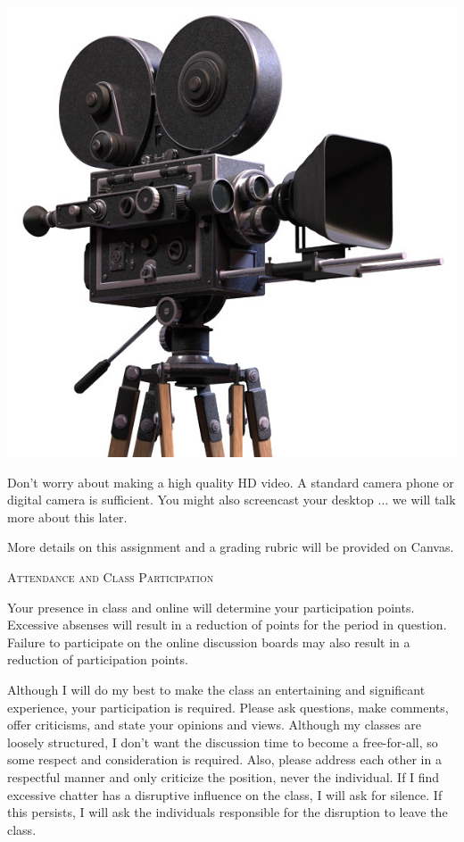 \documentclass{tufte-handout}
\begin{document}
\begin{marginfigure}%
  \includegraphics[width=\linewidth]{../assets/moviecamera.jpg}
  \caption{Don't worry about making a high quality HD video. A standard camera phone or digital camera is sufficient. You might also screencast your desktop $\ldots$ we will talk more about this later.}
  \label{fig:marginfig}
\end{marginfigure}

More details on this assignment and a grading rubric will be provided on Canvas.

\begin{center}
\textsc{Attendance and Class Participation}
\end{center}
Your presence in class and online will determine your participation points. Excessive absenses will result in a reduction of points for the period in question. Failure to participate on the online discussion boards may also result in a reduction of participation points.

Although I will do my best to make the class an entertaining and significant experience, your participation is required. Please ask questions, make comments, offer criticisms, and state your opinions and views. Although my classes are loosely structured, I don't want the discussion time to become a free-for-all, so some respect and consideration is required. Also, please address each other in a respectful manner and only criticize the position, never the individual. If I find excessive chatter has a disruptive influence on the class, I will ask for silence. If this persists, I will ask the individuals responsible for the disruption to leave the class.
\end{document}
